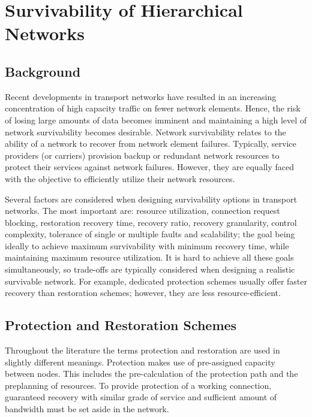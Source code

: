 \chapter{Survivability of Hierarchical Networks}
\label{chapter.SurvivabilityOfHierchicalNetworks}

\section{Background}
Recent developments in transport networks have resulted in an increasing
concentration of high capacity traffic on fewer network elements.
Hence, the risk of losing large amounts of data becomes imminent and
maintaining a high level of network survivability becomes desirable.
Network survivability relates to the ability of a network to recover
from network element failures. Typically, service providers (or carriers)
provision backup or redundant network resources to protect their services
against network failures. However, they are equally faced with the
objective to efficiently utilize their network resources.

Several factors are considered when designing survivability options
in transport networks. The most important are: resource utilization,
connection request blocking, restoration recovery time, recovery ratio,
recovery granularity, control complexity, tolerance of single or multiple
faults and scalability; the goal being ideally to achieve maximum
survivability with minimum recovery time, while maintaining maximum
resource utilization. It is hard to achieve all these goals simultaneously,
so trade-offs are typically considered when designing a realistic survivable
network. For example, dedicated protection schemes usually offer faster
recovery than restoration schemes; however, they are less resource-efficient.


\section{Protection and Restoration Schemes}

Throughout the literature the terms protection and restoration are
used in slightly different meanings. Protection makes use of pre-assigned
capacity between nodes. This includes the pre-calculation of the protection
path and the preplanning of resources. To provide protection of a
working connection, guaranteed recovery with similar grade of service
and sufficient amount of bandwidth must be set aside in the network.

